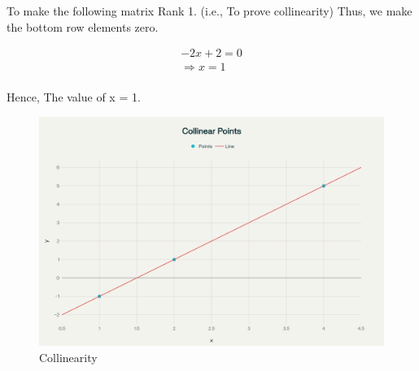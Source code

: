 \documentclass[journal]{IEEEtran}
\begin{document}
To make the following matrix Rank 1. (i.e., To prove collinearity)
Thus, we make the bottom row elements zero.



\begin{align*}
-2x + 2 = 0 \\
\Rightarrow x = 1 \\
\end{align*}

Hence, The value of x = 1.


\begin{figure}
    \centering
    \includegraphics[width=0.8\columnwidth]{figs/fig.png}
    \caption{Collinearity}
    \label{fig:placeholder}
\end{figure}
\end{document}
